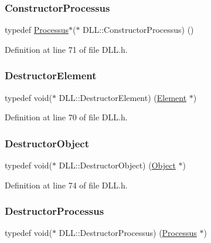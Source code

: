 \subsubsection{\texorpdfstring{Constructor\+Processus}{ConstructorProcessus}}
{\footnotesize\ttfamily typedef \hyperlink{classProcessus}{Processus}$\ast$($\ast$ D\+L\+L\+::\+Constructor\+Processus) ()}



Definition at line 71 of file D\+L\+L.\+h.

\mbox{\label{classDLL_a204f0c776712969410a2673db3d98cf5}} 
\subsubsection{\texorpdfstring{Destructor\+Element}{DestructorElement}}
{\footnotesize\ttfamily typedef void($\ast$ D\+L\+L\+::\+Destructor\+Element) (\hyperlink{classElement}{Element} $\ast$)}



Definition at line 70 of file D\+L\+L.\+h.

\mbox{\label{classDLL_a4400d330cd793ae5f883ffa58384f637}} 
\subsubsection{\texorpdfstring{Destructor\+Object}{DestructorObject}}
{\footnotesize\ttfamily typedef void($\ast$ D\+L\+L\+::\+Destructor\+Object) (\hyperlink{classObject}{Object} $\ast$)}



Definition at line 74 of file D\+L\+L.\+h.

\mbox{\label{classDLL_a203a61b2a683e2751b5f3fe5a7187a7e}} 
\subsubsection{\texorpdfstring{Destructor\+Processus}{DestructorProcessus}}
{\footnotesize\ttfamily typedef void($\ast$ D\+L\+L\+::\+Destructor\+Processus) (\hyperlink{classProcessus}{Processus} $\ast$)}



